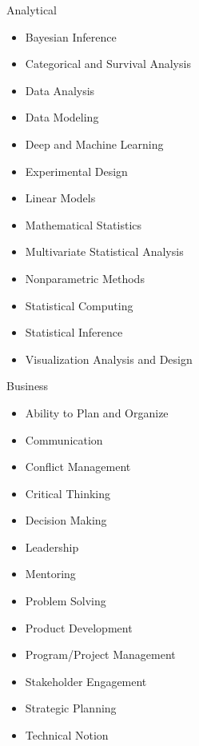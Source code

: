 
\begin{multicols*}{3}
\vspace*{-0.3 in}
\Competencies
{Analytical}
{\begin{itemize}
    \item Bayesian Inference
    \item Categorical and Survival Analysis
    \item Data Analysis
    \item Data Modeling
    \item Deep and Machine Learning
    \item Experimental Design
    \item Linear Models
    \item Mathematical Statistics
    \item Multivariate Statistical Analysis
    \item Nonparametric Methods
    \item Statistical Computing
    \item Statistical Inference
    \item Visualization Analysis and Design
\end{itemize}}

\vspace*{-0.3 in}
\Competencies
{Business}
{\begin{itemize}
    \item Ability to Plan and Organize
    \item Communication
    \item Conflict Management
    \item Critical Thinking
    \item Decision Making
    \item Leadership
    \item Mentoring
    \item Problem Solving
    \item Product Development
    \item Program/Project Management
    \item Stakeholder Engagement
    \item Strategic Planning
    \item Technical Notion
\end{itemize}}


\end{multicols*}
